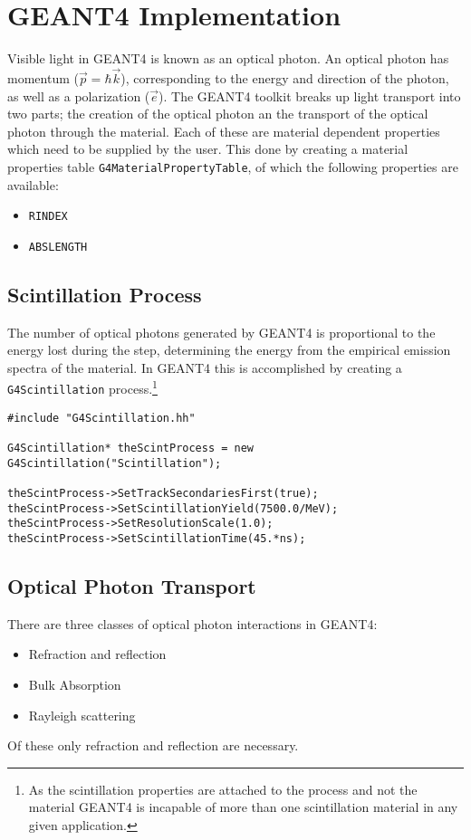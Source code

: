 

\section*{GEANT4 Implementation}
Visible light in GEANT4 is known as an optical photon.
An optical photon has momentum ($\vec{p} = \hbar \vec{k}$), corresponding to the energy and direction of the photon, as well as a polarization ($\vec{e}$).
The GEANT4 toolkit breaks up light transport into two parts; the creation of the optical photon an  the transport of the optical photon through the material.
Each of these are material dependent properties which need to be supplied by the user.
This done by creating a material properties table \lstinline{G4MaterialPropertyTable}, of which the following properties are available:
\begin{itemize}
    \item \verb+RINDEX+
    \item \verb+ABSLENGTH+
\end{itemize}
\subsection{Scintillation Process}
The number of optical photons generated by GEANT4 is proportional to the energy lost during the step, determining the energy from the empirical emission spectra of the material.
In GEANT4 this is accomplished by creating a \verb+G4Scintillation+ process.\footnote{As the scintillation properties are attached to the process and not the material GEANT4 is incapable of more than one scintillation material in any given application.}
\begin{lstlisting}
#include "G4Scintillation.hh"

G4Scintillation* theScintProcess = new G4Scintillation("Scintillation");

theScintProcess->SetTrackSecondariesFirst(true);
theScintProcess->SetScintillationYield(7500.0/MeV);
theScintProcess->SetResolutionScale(1.0);
theScintProcess->SetScintillationTime(45.*ns);
\end{lstlisting}

\subsection{Optical Photon Transport}
There are three classes of optical photon interactions in GEANT4:
\begin{itemize}
    \item Refraction and reflection
    \item Bulk Absorption
    \item Rayleigh scattering
\end{itemize}
Of these only refraction and reflection are necessary. \cite{cern_interactionsOfOpticalPhotons}

